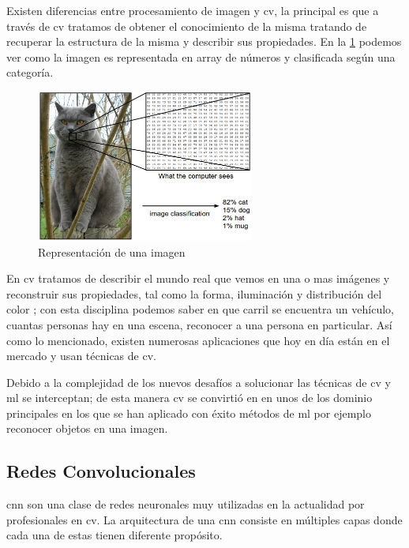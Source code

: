 Existen diferencias entre procesamiento de imagen y \ac{cv}, la principal es que a través de \ac{cv} tratamos de obtener el conocimiento de la misma tratando de recuperar  la estructura de la misma y describir  sus propiedades. En la \ref{Fig: cv-1} podemos ver como la imagen es representada en array de números y clasificada según una categoría.
\begin{figure}[H]
 \centering
  \includegraphics[height=5cm,keepaspectratio=true,clip=true]{imagenes/MarcoTeorico/cv-1.png}
  \caption{Representación de una imagen}
	\label{Fig: cv-1}
\end{figure}


En \ac{cv} tratamos de describir el mundo real que vemos en una o mas imágenes y reconstruir sus propiedades, tal como la forma, iluminación y distribución del color \citep{Szeliski}; con esta disciplina podemos saber en que carril se encuentra un vehículo, cuantas personas hay en una escena, reconocer a una persona en particular. Así como lo mencionado, existen numerosas aplicaciones que hoy en día están en el mercado  y usan técnicas de \ac{cv}. 

Debido a la complejidad de los nuevos desafíos a solucionar las técnicas de \ac{cv} y \ac{ml} se interceptan; de esta manera \ac{cv}  se convirtió en en unos de los dominio principales en los que se han aplicado con éxito métodos de \ac{ml} por ejemplo reconocer objetos en una imagen. 


\subsection{Redes Convolucionales}\label{sub:cnn}
\ac{cnn} son una clase de redes neuronales muy utilizadas en la actualidad por profesionales en \ac{cv}. La arquitectura de una \ac{cnn} consiste en múltiples capas donde cada una de estas tienen diferente propósito.

